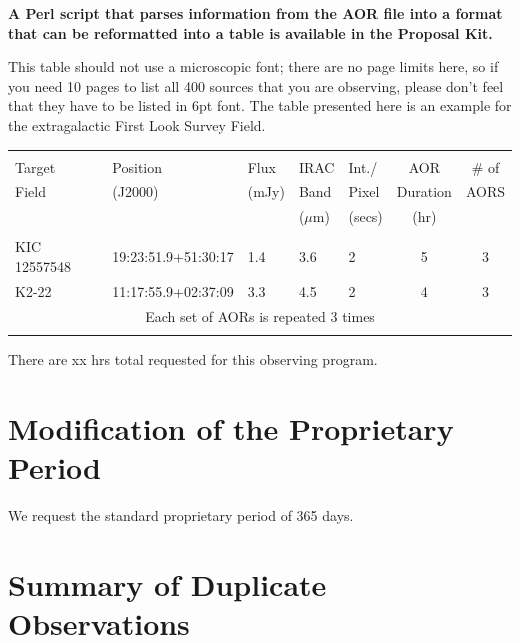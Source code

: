 \documentclass[letterpaper,12pt]{article}
\begin{document}
{\bf A Perl script that parses information from the AOR file into 
a format that can be reformatted into a table is available in the Proposal Kit.}\newline

This table should not use a microscopic font; there are no page
limits here, so if you need 10 pages to list all 400 sources that
you are observing, please don't feel that they have to be listed
in 6pt font. The table presented here is an example for the extragalactic 
First Look Survey Field.\newline

\bigskip
\begin{tabular}{lllllcc}
\hline \\ 
Target & Position & Flux     & IRAC  & Int./ & AOR & \# of \\
Field & (J2000)   & (mJy) & Band & Pixel & Duration & AORS \\
& &  & ($\mu$m) & (secs) & (hr) & \\
\hline \\ 
KIC 12557548 & 19:23:51.9+51:30:17 & 1.4 & 3.6 & 2 & 5 & 3 \\
K2-22 & 11:17:55.9+02:37:09 & 3.3 & 4.5 & 2 & 4 & 3 \\
\multicolumn{7}{c}{Each set of AORs is repeated 3 times} \\
\hline \\
\end{tabular}


There are xx hrs total requested for this observing program.\newline



\section{Modification of the Proprietary Period}

We request the standard proprietary period of 365 days.

\section{Summary of Duplicate Observations}
\end{document}
